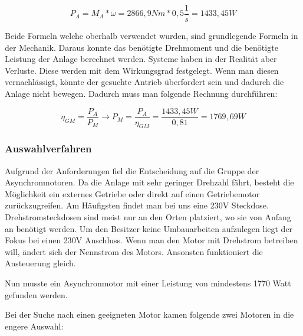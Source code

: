  
\begin{center}
\begin{equation}
  \label{eq:3}
	P_{A} = M_{A} * \omega = 2866,9 Nm * 0,5 \dfrac{1}{s} = 1433,45W
\end{equation} 
\end{center}

Beide Formeln welche oberhalb verwendet wurden, sind grundlegende Formeln in der Mechanik. Daraus konnte das benötigte Drehmoment und die benötigte Leistung der Anlage berechnet werden. Systeme haben in der Realität aber Verluste. Diese werden mit dem Wirkungsgrad festgelegt. Wenn man diesen vernachlässigt, könnte der gesuchte Antrieb überfordert sein und dadurch die Anlage nicht bewegen. Dadurch muss man folgende Rechnung durchführen:

\begin{center}
\begin{equation}
  \label{eq:4}
	\eta_{GM}= \frac{P_{A}}{P_{M}} \rightarrow P_{M} = \frac{P_{A}}{\eta_{GM}} = \frac{1433,45W}{0,81} = 1769,69W
\end{equation} 
\end{center}

\subsubsection{Auswahlverfahren}
\label{sec:auswahlverfahren}

Aufgrund der Anforderungen fiel die Entscheidung auf die Gruppe der Asynchronmotoren. Da die Anlage mit sehr geringer Drehzahl fährt, besteht die Möglichkeit ein externes Getriebe oder direkt auf einen Getriebemotor zurückzugreifen. 
Am Häufigsten findet man bei uns eine 230V Steckdose. Drehstromsteckdosen sind meist nur an den Orten platziert, wo sie von Anfang an benötigt werden. Um den Besitzer keine Umbauarbeiten aufzulegen liegt der Fokus bei einen 230V Anschluss. Wenn man den Motor mit Drehstrom betreiben will, ändert sich der Nennstrom des Motors. Ansonsten funktioniert die Ansteuerung gleich.

Nun musste ein Asynchronmotor mit einer Leistung von mindestens 1770 Watt gefunden werden.

Bei der Suche nach einen geeigneten Motor kamen folgende zwei Motoren in die engere Auswahl:


